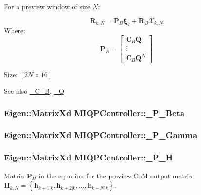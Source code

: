 \-For a preview window of size $N$\-:

\[ \mathbf{R}_{k,N} = \mathbf{P}_B \mathbf{\xi}_k + \mathbf{R}_B \mathcal{X}_{k,N} \] \-Where\-: \[ \mathbf{P}_B = \left[\begin{array}{c} \mathbf{C}_B \mathbf{Q} \\ \vdots\\ \mathbf{C}_B \mathbf{Q}^N \end{array}\right] \]

\-Size\-: $[2N\times16]$

\begin{DoxySeeAlso}{\-See also}
\hyperlink{classMIQPController_a5c6882cb248e9d16513868fea7835d6e}{\-\_\-\-C\-\_\-\-B}, \hyperlink{classMIQPController_ac6404f74d6002d6a0ca4bd2d0b41d548}{\-\_\-\-Q} 
\end{DoxySeeAlso}
\hypertarget{classMIQPController_a98a9700860258849ba5ab8568f610e2f}{
\subsubsection[{\-\_\-\-P\-\_\-\-Beta}]{\setlength{\rightskip}{0pt plus 5cm}\-Eigen\-::\-Matrix\-Xd {\bf \-M\-I\-Q\-P\-Controller\-::\-\_\-\-P\-\_\-\-Beta}}}\label{classMIQPController_a98a9700860258849ba5ab8568f610e2f}
\hypertarget{classMIQPController_a2eb96aa1ababc704065fe301aeb394f7}{
\subsubsection[{\-\_\-\-P\-\_\-\-Gamma}]{\setlength{\rightskip}{0pt plus 5cm}\-Eigen\-::\-Matrix\-Xd {\bf \-M\-I\-Q\-P\-Controller\-::\-\_\-\-P\-\_\-\-Gamma}}}\label{classMIQPController_a2eb96aa1ababc704065fe301aeb394f7}
\hypertarget{classMIQPController_afb83c4fddc4adba989506ccc9b62ff1e}{
\subsubsection[{\-\_\-\-P\-\_\-\-H}]{\setlength{\rightskip}{0pt plus 5cm}\-Eigen\-::\-Matrix\-Xd {\bf \-M\-I\-Q\-P\-Controller\-::\-\_\-\-P\-\_\-\-H}}}\label{classMIQPController_afb83c4fddc4adba989506ccc9b62ff1e}
\-Matrix $\mathbf{P}_H$ in the equation for the preview \-Co\-M output matrix $\mathbf{H}_{k,N} = \left\{ \mathbf{h}_{k+1|k}, \mathbf{h}_{k+2|k}, \dots, \mathbf{h}_{k+N|k} \right\}$.

